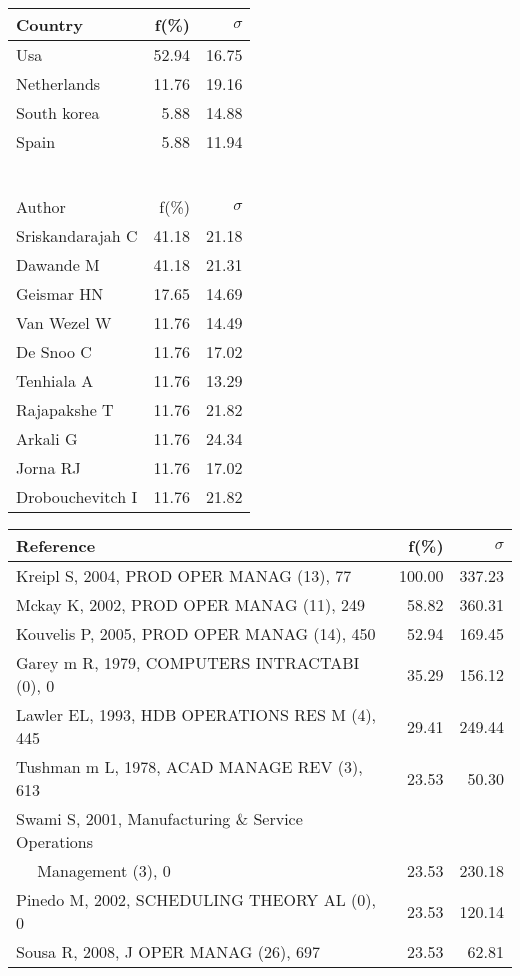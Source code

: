 \documentclass[a4paper,11pt]{report}
\begin{document}
\begin{landscape}
\begin{table}[!ht]
{\begin{tabular}{|l r r|}
\hline
\hline
Country & f(\%) & $\sigma$\\
\hline
Usa & 52.94 & 16.75\\
Netherlands & 11.76 & 19.16\\
South korea & 5.88 & 14.88\\
Spain & 5.88 & 11.94\\
 &  & \\
 &  & \\
 &  & \\
 &  & \\
 &  & \\
 &  & \\
\hline
\hline
Author & f(\%) & $\sigma$\\
\hline
Sriskandarajah C & 41.18 & 21.18\\
Dawande M & 41.18 & 21.31\\
Geismar HN & 17.65 & 14.69\\
Van Wezel W & 11.76 & 14.49\\
De Snoo C & 11.76 & 17.02\\
Tenhiala A & 11.76 & 13.29\\
Rajapakshe T & 11.76 & 21.82\\
Arkali G & 11.76 & 24.34\\
Jorna RJ & 11.76 & 17.02\\
Drobouchevitch I & 11.76 & 21.82\\
\hline
\end{tabular}
}
{\scriptsize\begin{tabular}{|l r r|}
\hline
Reference & f(\%) & $\sigma$\\
\hline
Kreipl S, 2004, PROD OPER MANAG (13), 77 & 100.00 & 337.23\\
Mckay K, 2002, PROD OPER MANAG (11), 249 & 58.82 & 360.31\\
Kouvelis P, 2005, PROD OPER MANAG (14), 450 & 52.94 & 169.45\\
Garey m R, 1979, COMPUTERS INTRACTABI (0), 0 & 35.29 & 156.12\\
Lawler EL, 1993, HDB OPERATIONS RES M (4), 445 & 29.41 & 249.44\\
Tushman m L, 1978, ACAD MANAGE REV (3), 613 & 23.53 & 50.30\\
Swami S, 2001, Manufacturing \& Service Operations &  & \\
$\quad$ Management (3), 0 & 23.53 & 230.18\\
Pinedo M, 2002, SCHEDULING THEORY AL (0), 0 & 23.53 & 120.14\\
Sousa R, 2008, J OPER MANAG (26), 697 & 23.53 & 62.81\\

\end{tabular}}
\end{table}
\end{landscape}
\end{document}
